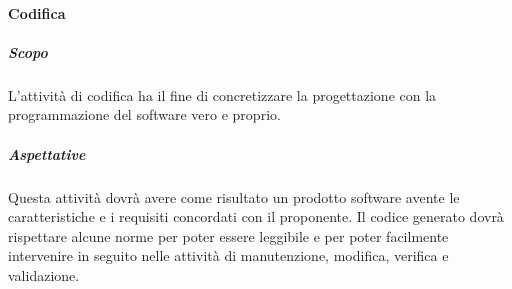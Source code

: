         \paragraph{Codifica}    \label{paragraph:Codifica}
            \subparagraph{Scopo}    \label{subparagraph:Codifica_Scopo}
            L'attività di codifica ha il fine di concretizzare la progettazione con la programmazione del software vero e proprio.

            \subparagraph{Aspettative}    \label{subparagraph:Codifica_Aspettative}
            Questa attività dovrà avere come risultato un prodotto software avente le caratteristiche e i requisiti concordati con il proponente. Il codice generato dovrà 
            rispettare alcune norme per poter essere leggibile e per poter facilmente intervenire in seguito nelle attività di manutenzione, modifica, verifica e validazione.

